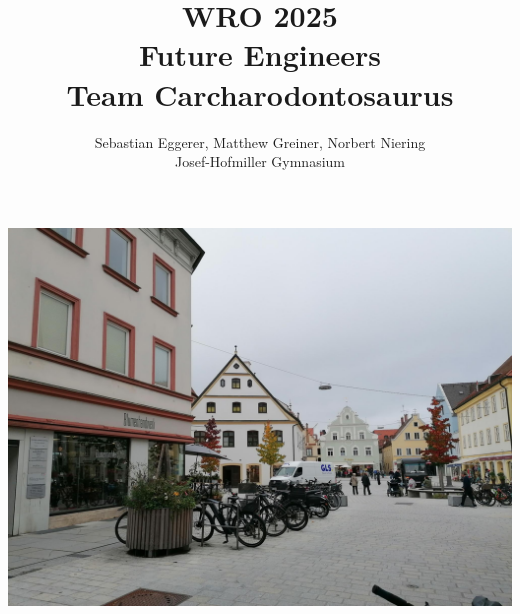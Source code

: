 \documentclass{article}
\title{
    \vspace{-2cm}
    \Huge WRO 2025 \\ Future Engineers \\[0.5cm]
    \LARGE Team Carcharodontosaurus
}
\author{
    \large Sebastian Eggerer, Matthew Greiner, Norbert Niering \\ [0.2cm]
    \large Josef-Hofmiller Gymnasium
}
\date{}
\begin{document}
\maketitle
\begin{center}
  \includegraphics[scale=0.17]{team_photo}
\end{center}


\newpage
\end{document}
